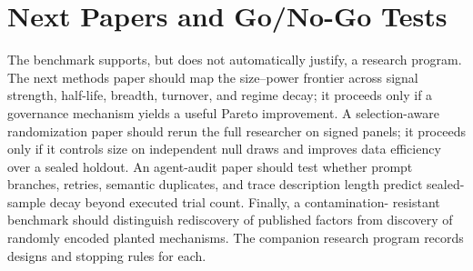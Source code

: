 \documentclass[sigconf,nonacm]{acmart}
\begin{document}
\section{Next Papers and Go/No-Go Tests}

The benchmark supports, but does not automatically justify, a research program.
The next methods paper should map the size--power frontier across signal
strength, half-life, breadth, turnover, and regime decay; it proceeds only if a
governance mechanism yields a useful Pareto improvement. A selection-aware
randomization paper should rerun the full researcher on signed panels; it
proceeds only if it controls size on independent null draws and improves data
efficiency over a sealed holdout. An agent-audit paper should test whether prompt
branches, retries, semantic duplicates, and trace description length predict
sealed-sample decay beyond executed trial count. Finally, a contamination-
resistant benchmark should distinguish rediscovery of published factors from
discovery of randomly encoded planted mechanisms. The companion research
program records designs and stopping rules for each.
\end{document}

